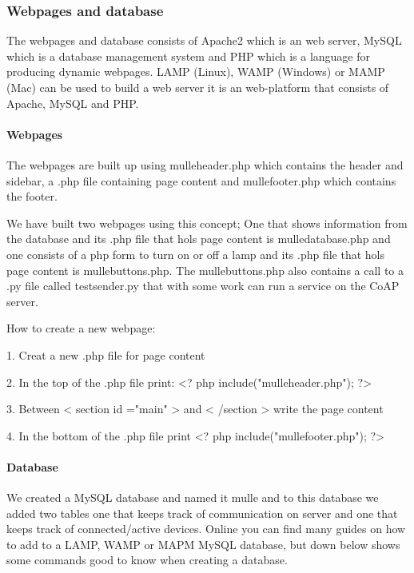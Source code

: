 \subsubsection{Webpages and database}
 
The webpages and database consists of Apache2 which is an web server, MySQL which is a database management system and PHP which is a language for producing dynamic webpages.
LAMP (Linux), WAMP (Windows) or MAMP (Mac) can be used to build a web server it is an web-platform that consists of Apache, MySQL and PHP.

\paragraph{Webpages}

The webpages are built up using mulleheader.php which contains the header and sidebar, a .php file containing page content and mullefooter.php which contains the footer.

We have built two webpages using this concept; One that shows information from the database and its .php file that hols page content is mulledatabase.php and one consists of 
a php form to turn on or off a lamp and its .php file that hols page content is mullebuttons.php. The mullebuttons.php also contains a call to a .py file called testsender.py
that with some work can run a service on the CoAP server.


How to create a new webpage:

1. 	Creat a new .php file for page content

2. 	In the top of the .php file print: <? php include("mulleheader.php"); ?>

3. 	Between < section id ="main" > and < /section > write the page content

4. 	In the bottom of the .php file print <? php include("mullefooter.php"); ?>

\paragraph{Database}

We created a MySQL database and named it mulle and to this database we added two tables one that keeps track of communication on server and one that keeps track of connected/active 
devices. Online you can find many guides on how to add to a LAMP, WAMP or MAPM MySQL database, but down below shows some commands good to know when creating a database.  


